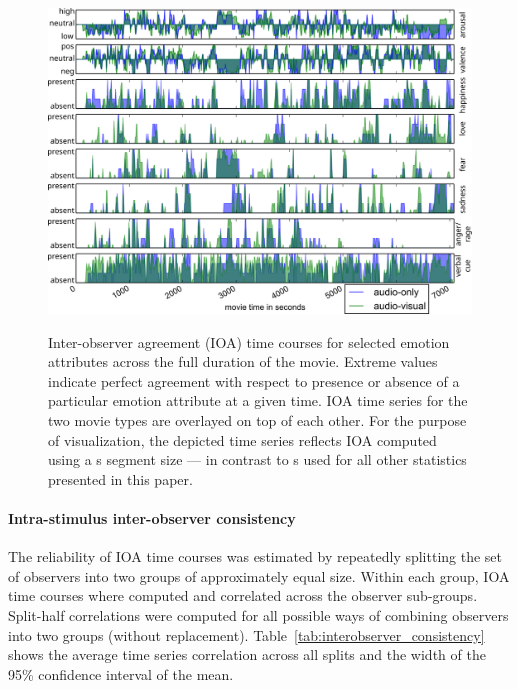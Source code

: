 \documentclass[10pt,a4paper,twocolumn]{article}
\begin{document}
\begin{figure}
  \centering
  \includegraphics[width=\linewidth]{figures/indicator_ts_allchar}\\
  \caption{Inter-observer agreement (IOA) time courses for selected emotion
    attributes across the full duration of the movie. Extreme values indicate
    perfect agreement with respect to presence or absence of a particular emotion
    attribute at a given time. IOA time series for the two movie types are
    overlayed on top of each other.
    For the purpose of
    visualization, the depicted time series reflects IOA computed using a
    \unit[10]{s} segment size --- in contrast to \unit[1]{s} used for all other
  statistics presented in this paper.}
  \label{fig:indicatortsallchar}
\end{figure}


\paragraph{Intra-stimulus inter-observer consistency}

The reliability of IOA time courses was estimated by repeatedly splitting the
set of observers into two groups of approximately equal size. Within each
group, IOA time courses where computed and correlated across the observer
sub-groups. Split-half correlations were computed for all possible ways of
combining observers into two groups (without replacement).
Table~\ref{tab:interobserver_consistency} shows the average time series
correlation across all splits and the width of the 95\% confidence interval of
the mean.
\end{document}
